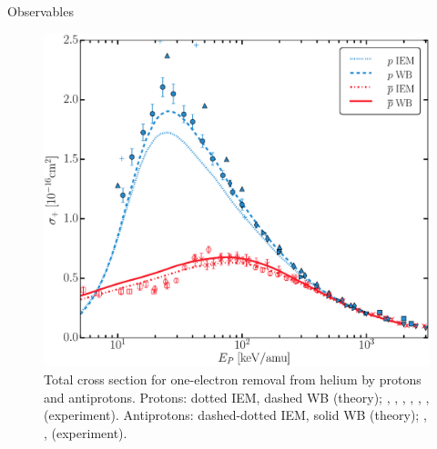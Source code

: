 \documentclass[letterpaper, 12 pt]{report}
\begin{document}
\begin{chapter}{Observables \label{chap:p-he2p-he}}

\begin{figure}[htp]
   \centering
   \includegraphics[width = \linewidth]{./images/pbarhe/pbarhe-+.eps}
   \caption[Total cross section for one-electron removal from helium by protons and antiprotons.]
           {Total cross section for one-electron removal from helium by protons and
            antiprotons. Protons: dotted IEM, dashed WB (theory); {\color{blue}{$\blacktriangle$}}
            \cite{DTR84}, {\color{blue}{$+$}} \cite{Sol62}, {\color{blue}{$\bullet$}} \cite{SG89},
            {\color{blue}{$\blacklozenge$}} \cite{SG85}, {\color{blue}{$\blacktriangleright$}}
            \cite{PM70}, {\color{blue}{$\blacktriangledown$}} \cite{Wex64},
            {\color{blue}{$\blacksquare$}} \cite{KAH84} (experiment).
            Antiprotons: dashed-dotted IEM, solid WB (theory); {\color{red}{$\Box$}} \cite{KKT08},
            {\color{red}{$\circ$}} \cite{HKM94}, {\color{red}{$\times$}} \cite{AHK90} (experiment).
            \label{fig:he+}}
\end{figure}
   

\end{chapter}
\end{document}
